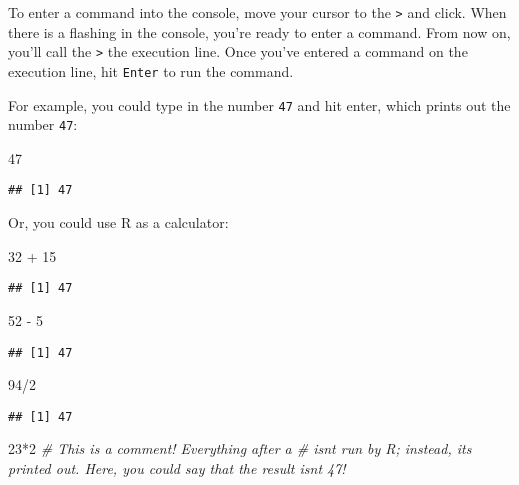 \documentclass[
]{article}
\newenvironment{Shaded}{\begin{snugshade}}{\end{snugshade}}
\newcommand{\CommentTok}[1]{\textcolor[rgb]{0.56,0.35,0.01}{\textit{#1}}}
\newcommand{\DecValTok}[1]{\textcolor[rgb]{0.00,0.00,0.81}{#1}}
\newcommand{\SpecialCharTok}[1]{\textcolor[rgb]{0.00,0.00,0.00}{#1}}
\begin{document}
To enter a command into the console, move your cursor to the
\texttt{\textgreater{}} and click. When there is a flashing
\texttt{\textbar{}} in the console, you're ready to enter a command.
From now on, you'll call the \texttt{\textgreater{}} the execution line.
Once you've entered a command on the execution line, hit \texttt{Enter}
to run the command.

For example, you could type in the number \texttt{47} and hit enter,
which prints out the number \texttt{47}:

\begin{Shaded}
\begin{Highlighting}[]
\DecValTok{47}
\end{Highlighting}
\end{Shaded}

\begin{verbatim}
## [1] 47
\end{verbatim}

Or, you could use R as a calculator:

\begin{Shaded}
\begin{Highlighting}[]
\DecValTok{32} \SpecialCharTok{+} \DecValTok{15}
\end{Highlighting}
\end{Shaded}

\begin{verbatim}
## [1] 47
\end{verbatim}

\begin{Shaded}
\begin{Highlighting}[]
\DecValTok{52} \SpecialCharTok{{-}} \DecValTok{5}
\end{Highlighting}
\end{Shaded}

\begin{verbatim}
## [1] 47
\end{verbatim}

\begin{Shaded}
\begin{Highlighting}[]
\DecValTok{94}\SpecialCharTok{/}\DecValTok{2}
\end{Highlighting}
\end{Shaded}

\begin{verbatim}
## [1] 47
\end{verbatim}

\begin{Shaded}
\begin{Highlighting}[]
\DecValTok{23}\SpecialCharTok{*}\DecValTok{2} \CommentTok{\# This is a comment! Everything after a \textquotesingle{}\#\textquotesingle{} isn\textquotesingle{}t run by R; instead, it\textquotesingle{}s printed out. Here, you could say that the result isn\textquotesingle{}t 47!}
\end{Highlighting}
\end{Shaded}
\end{document}

